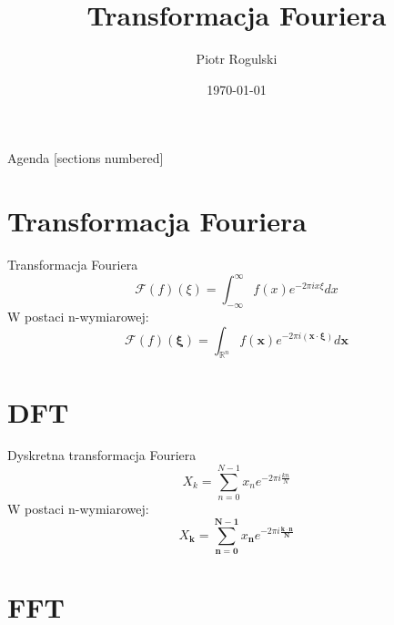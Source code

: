 \documentclass[polish, 12pt, aspectratio=169]{beamer}
\title{Transformacja Fouriera}
\author{Piotr Rogulski}
\date{\today}
\begin{document}
\frame{\titlepage}

\begin{frame}{Agenda}
    [sections numbered]
    \tableofcontents
\end{frame}

\section{Transformacja Fouriera}

\begin{frame}

\end{frame}

\begin{frame}{Transformacja Fouriera}
    \Huge
    \begin{equation*}
        \mathcal{F}(f)(\xi) = \int_{-\infty}^{\infty} f(x) e^{-2\pi i x \xi} dx
    \end{equation*}
    \pause{}
    \small
    W postaci n-wymiarowej:
    \normalsize
    \vspace{-1em}
    \begin{equation*}
        \mathcal{F}(f)(\symbf{\xi}) = \int_{\mathbb{R}^n} f(\symbf{x}) e^{-2\pi i (\symbf{x \cdot \xi})} d\symbf{x}
    \end{equation*}
\end{frame}

\section[DFT \\ {\normalsize Discrete Fourier Transform}]{DFT}

\begin{frame}{Dyskretna transformacja Fouriera}
    \Huge
    \begin{equation*}
        X_k = \sum_{n=0}^{N-1} x_n e^{-2\pi i \frac{kn}{N}}
    \end{equation*}
    \pause{}
    \small
    W postaci n-wymiarowej:
    \normalsize
    \vspace{-1em}
    \begin{equation*}
        X_{\symbf{k}} = \sum_{\symbf{n} = \symbf{0}}^{\symbf{N} - \symbf{1}} x_{\symbf{n}} e^{-2\pi i \frac{\symbf{k \cdot n}}{\symbf{N}}}
    \end{equation*}
\end{frame}

\section[FFT \\ {\normalsize Fast Fourier Transform}]{FFT}
\end{document}
